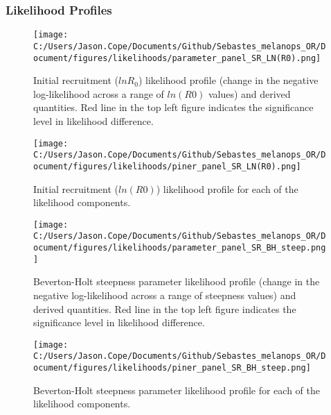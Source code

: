 \documentclass[11pt,
  english,
  letterpaper,
]{article}
\begin{document}
\newpage

\hypertarget{likelihood-profiles-2}{%
\subsubsection{Likelihood Profiles}\label{likelihood-profiles-2}}

\begin{figure}
\centering
\texttt{[image: C:/Users/Jason.Cope/Documents/Github/Sebastes\_melanops\_OR/Document/figures/likelihoods/parameter\_panel\_SR\_LN(R0).png]}
\caption{Initial recruitment (\(lnR_0\)) likelihood profile (change in the negative log-likelihood across a range of \(ln(R0)\) values) and derived quantities. Red line in the top left figure indicates the significance level in likelihood difference.\label{fig:R0-profile}}
\end{figure}

\pagebreak

\begin{figure}
\centering
\texttt{[image: C:/Users/Jason.Cope/Documents/Github/Sebastes\_melanops\_OR/Document/figures/likelihoods/piner\_panel\_SR\_LN(R0).png]}
\caption{Initial recruitment (\(ln(R0)\)) likelihood profile for each of the likelihood components.\label{fig:R0-profile-components}}
\end{figure}

\pagebreak

\begin{figure}
\centering
\texttt{[image: C:/Users/Jason.Cope/Documents/Github/Sebastes\_melanops\_OR/Document/figures/likelihoods/parameter\_panel\_SR\_BH\_steep.png]}
\caption{Beverton-Holt steepness parameter likelihood profile (change in the negative log-likelihood across a range of steepness values) and derived quantities. Red line in the top left figure indicates the significance level in likelihood difference.\label{fig:steepness-profile}}
\end{figure}

\pagebreak

\begin{figure}
\centering
\texttt{[image: C:/Users/Jason.Cope/Documents/Github/Sebastes\_melanops\_OR/Document/figures/likelihoods/piner\_panel\_SR\_BH\_steep.png]}
\caption{Beverton-Holt steepness parameter likelihood profile for each of the likelihood components.\label{fig:steepness-profile-components}}
\end{figure}
\end{document}
